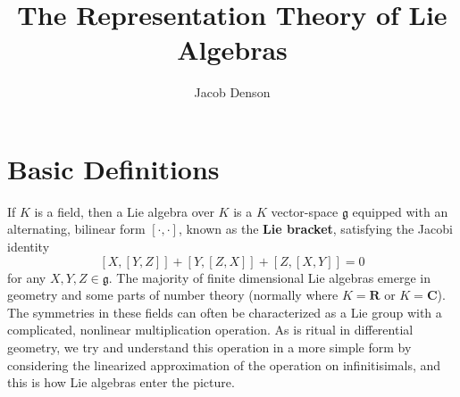 

\title{The Representation Theory of Lie Algebras}
\author{Jacob Denson}




\maketitle

\tableofcontents


\chapter{Basic Definitions}

If $K$ is a field, then a Lie algebra over $K$ is a $K$ vector-space $\mathfrak{g}$ equipped with an alternating, bilinear form $[\cdot, \cdot]$, known as the {\bf Lie bracket}, satisfying the Jacobi identity
%
\[ [X,[Y,Z]] + [Y,[Z,X]] + [Z,[X,Y]] = 0 \]
%
for any $X,Y,Z \in \mathfrak{g}$. The majority of finite dimensional Lie algebras emerge in geometry and some parts of number theory (normally where $K = \mathbf{R}$ or $K = \mathbf{C}$). The symmetries in these fields can often be characterized as a Lie group with a complicated, nonlinear multiplication operation. As is ritual in differential geometry, we try and understand this operation in a more simple form by considering the linearized approximation of the operation on infinitisimals, and this is how Lie algebras enter the picture.

